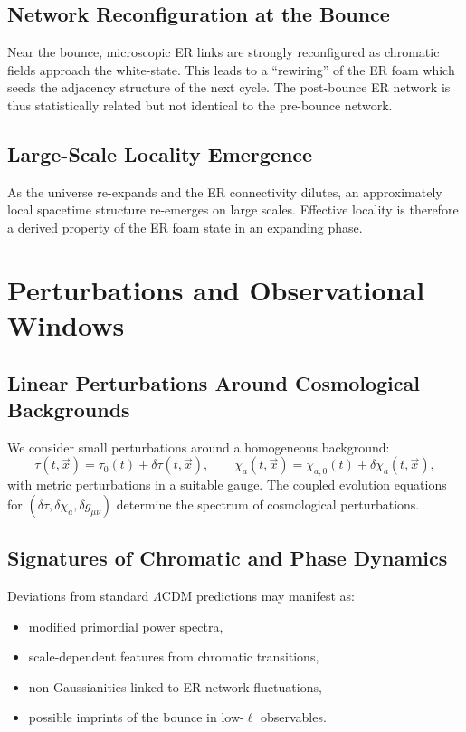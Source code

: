 \section{Network Reconfiguration at the Bounce}

Near the bounce, microscopic ER links are strongly reconfigured as chromatic fields approach the white-state.
This leads to a ``rewiring'' of the ER foam which seeds the adjacency structure of the next cycle.
The post-bounce ER network is thus statistically related but not identical to the pre-bounce network.

\section{Large-Scale Locality Emergence}

As the universe re-expands and the ER connectivity dilutes, an approximately local spacetime structure re-emerges on large scales.
Effective locality is therefore a derived property of the ER foam state in an expanding phase.

\chapter{Perturbations and Observational Windows}

\section{Linear Perturbations Around Cosmological Backgrounds}

We consider small perturbations around a homogeneous background:
\[
  \tau(t,\vec{x}) = \tau_0(t) + \delta\tau(t,\vec{x}), \qquad
  \chi_a(t,\vec{x}) = \chi_{a,0}(t) + \delta\chi_a(t,\vec{x}),
\]
with metric perturbations in a suitable gauge.
The coupled evolution equations for $(\delta\tau,\delta\chi_a,\delta g_{\mu\nu})$ determine the spectrum of cosmological perturbations.

\section{Signatures of Chromatic and Phase Dynamics}

Deviations from standard $\Lambda$CDM predictions may manifest as:

\begin{itemize}
  \item modified primordial power spectra,
  \item scale-dependent features from chromatic transitions,
  \item non-Gaussianities linked to ER network fluctuations,
  \item possible imprints of the bounce in low-$\ell$ observables.
\end{itemize}

